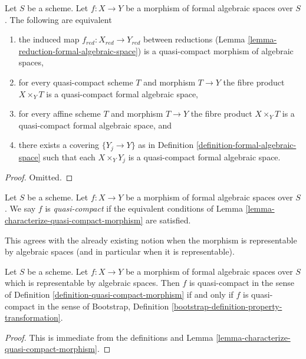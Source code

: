 \begin{lemma}
\label{lemma-characterize-quasi-compact-morphism}
Let $S$ be a scheme. Let $f : X \to Y$ be a morphism of formal algebraic
spaces over $S$. The following are equivalent
\begin{enumerate}
\item the induced map $f_{red} : X_{red} \to Y_{red}$ between reductions
(Lemma \ref{lemma-reduction-formal-algebraic-space}) is a quasi-compact
morphism of algebraic spaces,
\item for every quasi-compact scheme $T$ and morphism $T \to Y$
the fibre product $X \times_Y T$ is a quasi-compact formal
algebraic space,
\item for every affine scheme $T$ and morphism $T \to Y$
the fibre product $X \times_Y T$ is a quasi-compact formal
algebraic space, and
\item there exists a covering $\{Y_j \to Y\}$ as in
Definition \ref{definition-formal-algebraic-space}
such that each $X \times_Y Y_j$ is a quasi-compact formal algebraic space.
\end{enumerate}
\end{lemma}

\begin{proof}
Omitted.
\end{proof}

\begin{definition}
\label{definition-quasi-compact-morphism}
Let $S$ be a scheme. Let $f : X \to Y$ be a morphism of
formal algebraic spaces over $S$.
We say $f$ is {\it quasi-compact} if the equivalent conditions of
Lemma \ref{lemma-characterize-quasi-compact-morphism} are satisfied.
\end{definition}

\noindent
This agrees with the already existing notion when the morphism
is representable by algebraic spaces (and in particular when it is
representable).

\begin{lemma}
\label{lemma-quasi-compact-representable}
Let $S$ be a scheme. Let $f : X \to Y$ be a morphism of formal algebraic
spaces over $S$ which is representable by algebraic spaces.
Then $f$ is quasi-compact in the sense of
Definition \ref{definition-quasi-compact-morphism}
if and only if $f$ is quasi-compact in the sense of
Bootstrap, Definition \ref{bootstrap-definition-property-transformation}.
\end{lemma}

\begin{proof}
This is immediate from the definitions and
Lemma \ref{lemma-characterize-quasi-compact-morphism}.
\end{proof}





